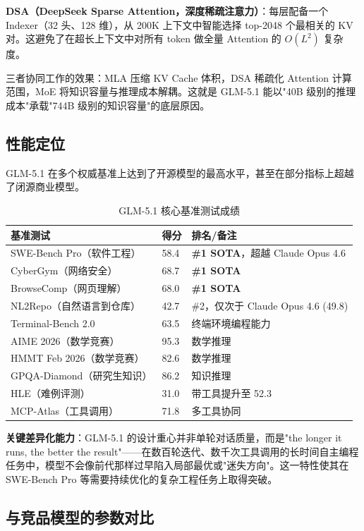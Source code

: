 \documentclass[UTF8,a4paper,10pt,oneside]{ctexart}
\begin{document}
\textbf{DSA（DeepSeek Sparse Attention，深度稀疏注意力）}：每层配备一个 Indexer（32 头、128 维），从 200K 上下文中智能选择 top-2048 个最相关的 KV 对。这避免了在超长上下文中对所有 token 做全量 Attention 的 $O(L^2)$ 复杂度。

三者协同工作的效果：MLA 压缩 KV Cache 体积，DSA 稀疏化 Attention 计算范围，MoE 将知识容量与推理成本解耦。这就是 GLM-5.1 能以"40B 级别的推理成本"承载"744B 级别的知识容量"的底层原因。

\subsection{性能定位}

GLM-5.1 在多个权威基准上达到了开源模型的最高水平，甚至在部分指标上超越了闭源商业模型。

\begin{table}[htbp]
\centering
\caption{GLM-5.1 核心基准测试成绩}
\begin{tabular}{p{4.5cm}p{2cm}p{5.5cm}}
\hline
\textbf{基准测试} & \textbf{得分} & \textbf{排名/备注} \\
\hline
SWE-Bench Pro（软件工程） & 58.4 & \textbf{\#1 SOTA}，超越 Claude Opus 4.6 \\
CyberGym（网络安全） & 68.7 & \textbf{\#1 SOTA} \\
BrowseComp（网页理解） & 68.0 & \textbf{\#1 SOTA} \\
NL2Repo（自然语言到仓库） & 42.7 & \#2，仅次于 Claude Opus 4.6 (49.8) \\
Terminal-Bench 2.0 & 63.5 & 终端环境编程能力 \\
AIME 2026（数学竞赛） & 95.3 & 数学推理 \\
HMMT Feb 2026（数学竞赛）& 82.6 & 数学推理 \\
GPQA-Diamond（研究生知识）& 86.2 & 知识推理 \\
HLE（难例评测） & 31.0 & 带工具提升至 52.3 \\
MCP-Atlas（工具调用） & 71.8 & 多工具协同 \\
\hline
\end{tabular}
\end{table}

\textbf{关键差异化能力}：GLM-5.1 的设计重心并非单轮对话质量，而是"the longer it runs, the better the result"——在数百轮迭代、数千次工具调用的长时间自主编程任务中，模型不会像前代那样过早陷入局部最优或"迷失方向"。这一特性使其在 SWE-Bench Pro 等需要持续优化的复杂工程任务上取得突破。

\subsection{与竞品模型的参数对比}
\end{document}

